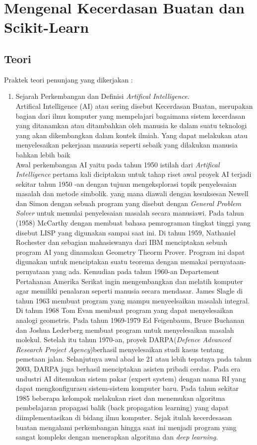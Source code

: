\chapter{Mengenal Kecerdasan Buatan dan Scikit-Learn}

\section{Teori}
Praktek teori penunjang yang dikerjakan :
\begin{enumerate}
\item Sejarah Perkembangan dan Definisi \textit{Artifical Intelligence}.\\ Artifical Intelligence (AI) atau sering disebut Kecerdasan Buatan, merupakan bagian dari ilmu komputer yang mempelajari bagaimana sistem kecerdasan yang ditanamkan atau ditambahkan oleh manusia ke dalam suatu teknologi yang akan dikembangkan dalam kontek ilmiah. Yang dapat melakukan atau menyelesaikan pekerjaan manusia seperti sebaik yang dilakukan manusia bahkan lebih baik\\
Awal perkembangan AI yaitu pada tahun 1950 istilah dari \textit{Artifical Intelligence} pertama kali diciptakan untuk tahap riset awal proyek AI terjadi sekitar tahun 1950 -an dengan tujuan mengeksplorasi topik penyelesaian masalah dan metode simbolik. yang mana diawali dengan kesuksesan Newell dan Simon dengan sebuah program yang disebut dengan \textit{General Problem Solver} untuk memulai penyelesaian masalah secara manusiawi. Pada tahun (1958) McCarthy dengan membuat bahasa pemrograman tingkat tinggi yang disebut  LISP yang digunakan sampai saat ini. Di tahun 1959, Nathaniel Rochester dan sebagian mahasiswanya dari IBM menciptakan sebuah program AI yang dinamakan Geometry Theorm Prover. Program ini dapat digunakan untuk menciptakan suatu teorema dengan memakai pernyataan-pernyataan yang ada. Kemudian pada tahun 1960-an Departement Pertahanan Amerika Serikat ingin mengembangkan dan melatih komputer agar memiliki penalaran seperti manusia secara mendasar. James Slagle di tahun 1963 membuat program yang mampu menyeelsaikan masalah integral. Di tahun 1968 Tom Evan membuat program yang dapat menyelesaikan analogi geometris. Pada tahun 1969-1979 Ed Feigenbaum, Bruce Buchanan dan Joshua Lederberg membuat program untuk menyelesaikan masalah molekul. Setelah itu tahun 1970-an, proyek DARPA(\textit{Defence Advanced Research Project Agency})berhasil menyelesaikan studi kasus tentang pemetaan jalan. Selanjutnya awal abad ke 21 atau lebih tepatnya pada tahun 2003, DARPA juga berhasil menciptakan asisten pribadi cerdas. Pada era undustri AI ditemukan sistem pakar (expert system) dengan nama RI yang dapat mengkonfigurasu sistem-sistem komputer baru. Pada tahun sekitar 1985 beberapa kelompok melakukan riset dan menemukan algoritma pembelajaran propagasi balik (back propagation learning) yang dapat diimplementasikan di bidang ilmu komputer. Sejak itulah kecerdesasan buatan mengalami perkembangan hingga saat ini menjadi program yang sangat kompleks dengan menerapkan algoritma dan \textit{deep learning}.


\end{enumerate}
